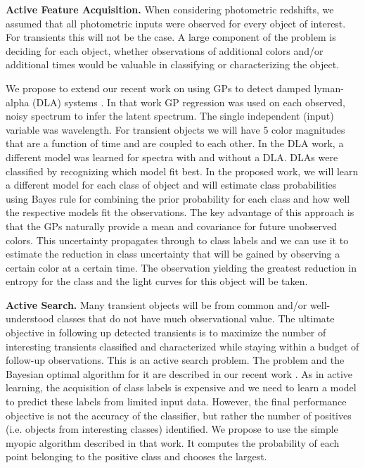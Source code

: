 \documentclass[prd, nofootinbib, floatfix, 12pt,tightenlines]{revtex4}
\begin{document}
{\bf Active Feature Acquisition.} When considering photometric redshifts,
we assumed that all photometric inputs were observed for every object of
interest.  For transients this will not be the case.  A large component of
the problem is deciding for each object, whether observations of additional
colors and/or additional times would be valuable in classifying or
characterizing the object.

We propose to extend our recent work on using GPs to detect damped
lyman-alpha (DLA) systems \cite{Garnett12a}.  In that work GP regression
was used on each observed, noisy spectrum to infer the latent spectrum.
The single independent (input) variable was wavelength.  For transient
objects we will have 5 color magnitudes that are a function of time and are
coupled to each other.  In the DLA work, a different model was learned for
spectra with and without a DLA.  DLAs were classified by recognizing which
model fit best.  In the proposed work, we will learn a different model for
each class of object and will estimate class probabilities using Bayes rule
for combining the prior probability for each class and how well the
respective models fit the observations.  The key advantage of this approach
is that the GPs naturally provide a mean and covariance for future
unobserved colors.  This uncertainty propagates through to class labels and
we can use it to estimate the reduction in class uncertainty that will be
gained by observing a certain color at a certain time.  The observation
yielding the greatest reduction in entropy for the class and the light
curves for this object will be taken.

{\bf Active Search.} Many transient objects will be from common and/or 
well-understood classes that do not have much observational value.  The ultimate
objective in following up detected transients is to maximize the number of
interesting transients classified and characterized while staying within a
budget of follow-up observations.  This is an active search problem. The
problem and the Bayesian optimal algorithm for it are described in our
recent work \cite{Garnett11,Garnett12}.  As in active learning, the
acquisition of class labels is expensive and we need to learn a model to
predict these labels from limited input data.  However, the final
performance objective is not the accuracy of the classifier, but rather the
number of positives (i.e. objects from interesting classes) identified.  We
propose to use the simple myopic algorithm described in that work.  It
computes the probability of each point belonging to the positive class and
chooses the largest.
\end{document}
